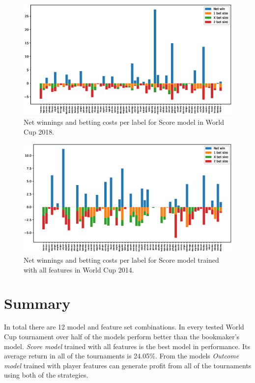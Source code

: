 \begin{figure}[H]
    \centering
    \includegraphics[width=1\textwidth]{img/match_level_2018_score_win_cost_.eps}
    \caption{Net winnings and betting costs per label for Score model in World Cup 2018.}
    \label{fig:net_win_cost_2018}
\end{figure}

\begin{figure}[H]
    \centering
    \includegraphics[width=1\textwidth]{img/match_level_2014_score_win_cost_.eps}
    \caption{Net winnings and betting costs per label for Score model trained with all features in World Cup 2014.}
    \label{fig:net_win_cost_2014}
\end{figure}

\section{Summary}
In total there are 12 model and feature set combinations. In every tested World Cup tournament over half of the models perform better than the bookmaker's model. \textit{Score model} trained with all features is the best model in performance. Its average return in all of the tournaments is 24.05\%. From the models \textit{Outcome model} trained with player features can generate profit from all of the tournaments using both of the strategies.


